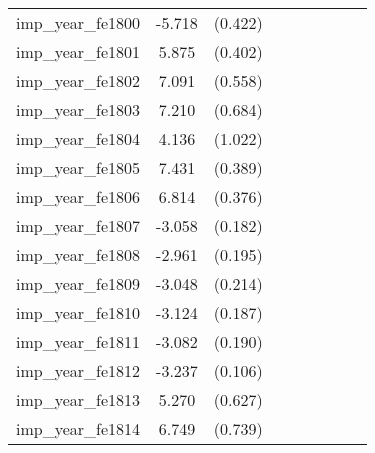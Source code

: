 {\begin{tabular}{l*{4}{cc}}
imp\_year\_fe1800&   -5.718\sym{***}&  (0.422)&                  &         &                  &         &                  &         \\
imp\_year\_fe1801&    5.875\sym{***}&  (0.402)&                  &         &                  &         &                  &         \\
imp\_year\_fe1802&    7.091\sym{***}&  (0.558)&                  &         &                  &         &                  &         \\
imp\_year\_fe1803&    7.210\sym{***}&  (0.684)&                  &         &                  &         &                  &         \\
imp\_year\_fe1804&    4.136\sym{***}&  (1.022)&                  &         &                  &         &                  &         \\
imp\_year\_fe1805&    7.431\sym{***}&  (0.389)&                  &         &                  &         &                  &         \\
imp\_year\_fe1806&    6.814\sym{***}&  (0.376)&                  &         &                  &         &                  &         \\
imp\_year\_fe1807&   -3.058\sym{***}&  (0.182)&                  &         &                  &         &                  &         \\
imp\_year\_fe1808&   -2.961\sym{***}&  (0.195)&                  &         &                  &         &                  &         \\
imp\_year\_fe1809&   -3.048\sym{***}&  (0.214)&                  &         &                  &         &                  &         \\
imp\_year\_fe1810&   -3.124\sym{***}&  (0.187)&                  &         &                  &         &                  &         \\
imp\_year\_fe1811&   -3.082\sym{***}&  (0.190)&                  &         &                  &         &                  &         \\
imp\_year\_fe1812&   -3.237\sym{***}&  (0.106)&                  &         &                  &         &                  &         \\
imp\_year\_fe1813&    5.270\sym{***}&  (0.627)&                  &         &                  &         &                  &         \\
imp\_year\_fe1814&    6.749\sym{***}&  (0.739)&                  &         &                  &         &                  &         \\

\end{tabular}}
